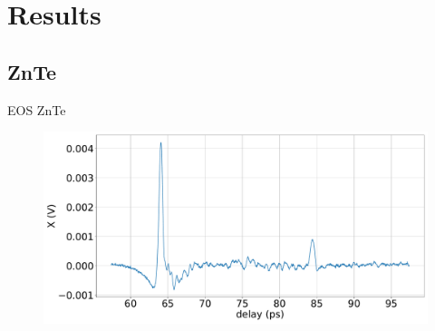 \documentclass[aspectratio=1610, 9pt]{beamer}
\begin{document}
\section{Results}
\subsection{ZnTe}
\begin{frame}{EOS ZnTe}
\begin{figure}
  \includegraphics[width=\textwidth]{images/2_11_30_20normalX.pdf}
\end{figure}
\end{frame}
\end{document}
